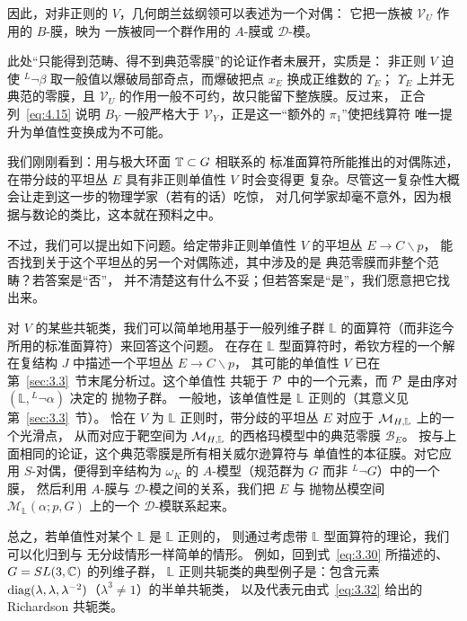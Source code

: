 因此，对非正则的 $V$，几何朗兰兹纲领可以表述为一个对偶：
它把一族被 $\mathcal V_U$ 作用的 $B$-膜，映为
一族被同一个群作用的
$A$-膜或 ${\mathcal D}$-模。

\begin{yizhu}[含糊点拨]此处“只能得到范畴、得不到典范零膜”的论证作者未展开，实质是：
非正则 $V$ 迫使 ${}^L\neg\beta$ 取一般值以爆破局部奇点，而爆破把点 $x_E$ 换成正维数的 $\Upsilon_E$；
$\Upsilon_E$ 上并无典范的零膜，且 $\mathcal V_U$ 的作用一般不可约，故只能留下整族膜。反过来，
正合列~\eqref{eq:4.15} 说明 $B_Y$ 一般严格大于 $\mathcal V_Y$，正是这一“额外的 $\pi_1$”使把线算符
唯一提升为单值性变换成为不可能。\end{yizhu}

\bigskip{}

我们刚刚看到：用与极大环面 ${\mathbb{T}}\subset G$ 相联系的
标准面算符所能推出的对偶陈述，
在带分歧的平坦丛 $E$ 具有非正则单值性 $V$ 时会变得更
复杂。尽管这一复杂性大概会让走到这一步的物理学家（若有的话）吃惊，
对几何学家却毫不意外，因为根据与数论的类比，这本就在预料之中。

不过，我们可以提出如下问题。给定带非正则单值性 $V$ 的平坦丛 $E\to C\backslash p$，
能否找到关于这个平坦丛的另一个对偶陈述，其中涉及的是
典范零膜而非整个范畴？若答案是“否”，
并不清楚这有什么不妥；但若答案是“是”，我们愿意把它找出来。

对 $V$ 的某些共轭类，我们可以简单地用基于一般列维子群 $\mathbb{L}$
的面算符（而非迄今所用的标准面算符）来回答这个问题。
在存在 $\mathbb{L}$ 型面算符时，希钦方程的一个解
在复结构 $J$ 中描述一个平坦丛 $E\to C\backslash p$，
其可能的单值性 $V$ 已在第~\ref{sec:3.3}~节末尾分析过。这个单值性
共轭于 $\mathcal{P}$ 中的一个元素，而 $\mathcal{P}$ 是由序对 $(\mathbb{L},{}^L\neg\alpha)$ 决定的
抛物子群。
一般地，该单值性是 $\mathbb{L}$ 正则的（其意义见第~\ref{sec:3.3}~节）。
恰在 $V$ 为 $\mathbb{L}$ 正则时，带分歧的平坦丛
$E$ 对应于 ${\mathcal{M}}_{H,\mathbb{L}}$ 上的一个光滑点，
从而对应于靶空间为 ${\mathcal{M}}_{H,\mathbb{L}}$ 的西格玛模型中的典范零膜
${\mathcal B}_{E}$。
按与上面相同的论证，这个典范零膜是所有相关威尔逊算符与
单值性的本征膜。对它应用 $S$-对偶，便得到辛结构为 $\omega_K$ 的
$A$-模型（规范群为 $G$ 而非 $^L\neg G$）中的一个膜，
然后利用 $A$-膜与 ${\mathcal D}$-模之间的关系，我们把 $E$ 与
抛物丛模空间 ${\mathcal M}_\mathbb{L}(\alpha;p,G)$ 上的一个 ${\mathcal D}$-模联系起来。

总之，若单值性对某个 $\mathbb{L}$ 是 $\mathbb{L}$ 正则的，
则通过考虑带 $\mathbb{L}$ 型面算符的理论，我们可以化归到与
无分歧情形一样简单的情形。
例如，回到式~\eqref{eq:3.30} 所描述的、$G=SL(3,{\mathbb{C}})$ 的列维子群，
$\mathbb{L}$ 正则共轭类的典型例子是：包含元素
${\rm diag}(\lambda,\lambda,\lambda^{-2})$（$\lambda^3\not=1$）的半单共轭类，
以及代表元由式~\eqref{eq:3.32} 给出的 Richardson 共轭类。

